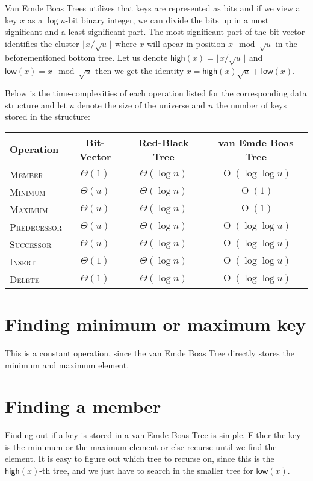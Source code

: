 \documentclass[oneside,11pt,openright]{report}
\newcommand{\BigO}[1]{\ensuremath{\operatorname{O}\left(#1\right)}}
\newcommand{\BigT}[1]{\ensuremath{\Theta\left(#1\right)}}
\newcommand{\Insert}{\textsc{Insert}}
\newcommand{\Delete}{\textsc{Delete}}
\newcommand{\Member}{\textsc{Member}}
\newcommand{\Minimum}{\textsc{Minimum}}
\newcommand{\Maximum}{\textsc{Maximum}}
\newcommand{\Predecessor}{\textsc{Predecessor}}
\newcommand{\Successor}{\textsc{Successor}}
\newcommand{\HIGH}{\textsf{high}}
\newcommand{\LOW}{\textsf{low}}
\begin{document}
Van Emde Boas Trees utilizes that keys are represented as bits and if
we view a key $x$ as a $\log u$-bit binary integer, we can divide the
bits up in a most significant and a least significant part. The most
significant part of the bit vector identifies the cluster
$\lfloor{x/\sqrt{u}}\rfloor$ where $x$ will apear in position $x \mod
\sqrt{u}$ in the beforementioned bottom tree. Let us denote $\HIGH(x)
= \lfloor{x/\sqrt{u}}\rfloor$ and $\LOW(x) = x \mod \sqrt{u}$ then we
get the identity $x = \HIGH(x) \sqrt{u} + \LOW(x)$.

Below is the time-complexities of each operation listed for the
corresponding data structure and let $u$ denote the size of the
universe and $n$ the number of keys stored in the structure:

\begin{center}
  \begin{tabular}{ l | c | c | c }
    Operation & Bit-Vector & Red-Black Tree & van Emde Boas Tree \\ \hline
    \Member & $\BigT{1}$ & $\BigT{\log n}$ & $\BigO{\log \log u}$ \\ 
    \Minimum & $\BigT{u}$ & $\BigT{\log n}$ & $\BigO{1}$\\ 
    \Maximum & $\BigT{u}$ & $\BigT{\log n}$ & $\BigO{1}$ \\ 
    \Predecessor & $\BigT{u}$ & $\BigT{\log n}$ & $\BigO{\log \log u}$  \\ 
    \Successor & $\BigT{u}$ & $\BigT{\log n}$ & $\BigO{\log \log u}$ \\ 
    \Insert & $\BigT{1}$ & $\BigT{\log n}$ & $\BigO{\log \log u}$ \\ 
    \Delete & $\BigT{1}$ & $\BigT{\log n}$ & $\BigO{\log \log u}$ \\
  \end{tabular}
\end{center}

\section{Finding minimum or maximum key}

This is a constant operation, since the van Emde Boas Tree directly stores the minimum and maximum element.

\section{Finding a member}

Finding out if a key is stored in a van Emde Boas Tree is simple. Either the key is the minimum or the maximum element or else recurse until we find the element. It is easy to figure out which tree to recurse on, since this is the $\HIGH(x)$-th tree, and we just have to search in the smaller tree for $\LOW(x)$.
\end{document}

